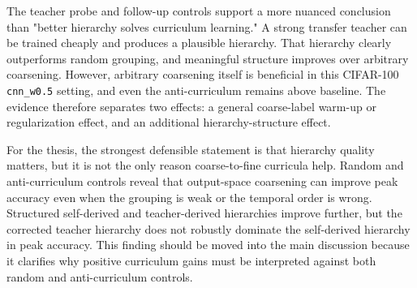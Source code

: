 The teacher probe and follow-up controls support a more nuanced conclusion than
"better hierarchy solves curriculum learning." A strong transfer teacher can be
trained cheaply and produces a plausible hierarchy. That hierarchy clearly
outperforms random grouping, and meaningful structure improves over arbitrary coarsening.
However, arbitrary coarsening itself is beneficial in this CIFAR-100
\texttt{cnn\_w0.5} setting, and even the anti-curriculum remains above baseline.
The evidence therefore separates two effects: a general coarse-label warm-up or
regularization effect, and an additional hierarchy-structure effect.

For the thesis, the strongest defensible statement is that hierarchy quality
matters, but it is not the only reason coarse-to-fine curricula help. Random and
anti-curriculum controls reveal that output-space coarsening can improve peak
accuracy even when the grouping is weak or the temporal order is wrong. Structured
self-derived and teacher-derived hierarchies improve further, but the corrected
teacher hierarchy does not robustly dominate the self-derived hierarchy in peak
accuracy. This finding should be moved into the main discussion because it
clarifies why positive curriculum gains must be interpreted against both random
and anti-curriculum controls.
